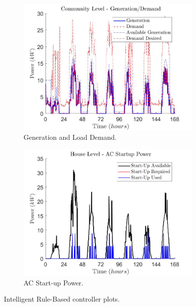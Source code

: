 \documentclass[11pt,usenames]{article}
\begin{document}
\begin{figure}[!t]
	\begin{subfigure}[t]{0.48\textwidth}
		\centering
		\includegraphics[scale=0.3]{Gainesville_BaseLine_7DayTest_SC_PVBat1_Bat1_PV1_None1_SCL1_Community_P_Generated_Demand.JPG}
		\caption{Generation and Load Demand.}
		\label{fig:GenDemand_2}
	\end{subfigure} 
	\begin{subfigure}[t]{0.48\textwidth}
		\centering
		\includegraphics[scale=0.3]{Gainesville_BaseLine_7DayTest_SC_PVBat1_Bat1_PV1_None1_SCL1_Community_AC_StartUpPower_Av_Req_U.JPG}
		\caption{AC Start-up Power.}
		\label{fig:AcStartUp_2}
	\end{subfigure} 
	\caption{Intelligent Rule-Based controller plots.}
	\label{fig:RuleBased}
\end{figure}
\end{document}
